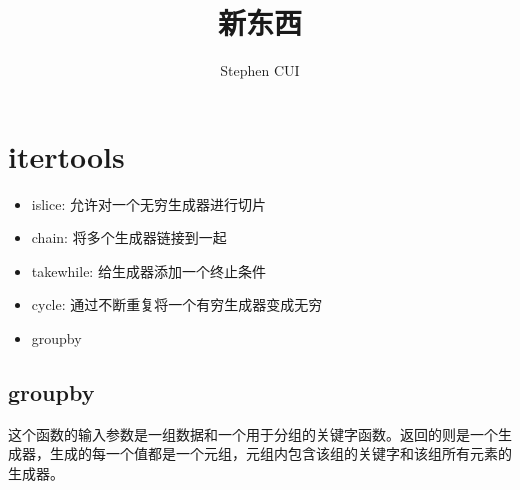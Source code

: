 \documentclass{article}
\title{新东西}
\author{Stephen CUI}
\begin{document}
\section{itertools}
\begin{itemize}
    \item islice: 允许对一个无穷生成器进行切片
    \item chain: 将多个生成器链接到一起
    \item takewhile: 给生成器添加一个终止条件
    \item cycle: 通过不断重复将一个有穷生成器变成无穷
    \item groupby
\end{itemize}
\subsection{groupby}
这个函数的输入参数是一组数据和一个用于分组的关键字函数。返回的则是一个生成器，生成的每一个值都是一个元组，元组内包含该组的关键字和该组所有元素的生成器。
\end{document}
